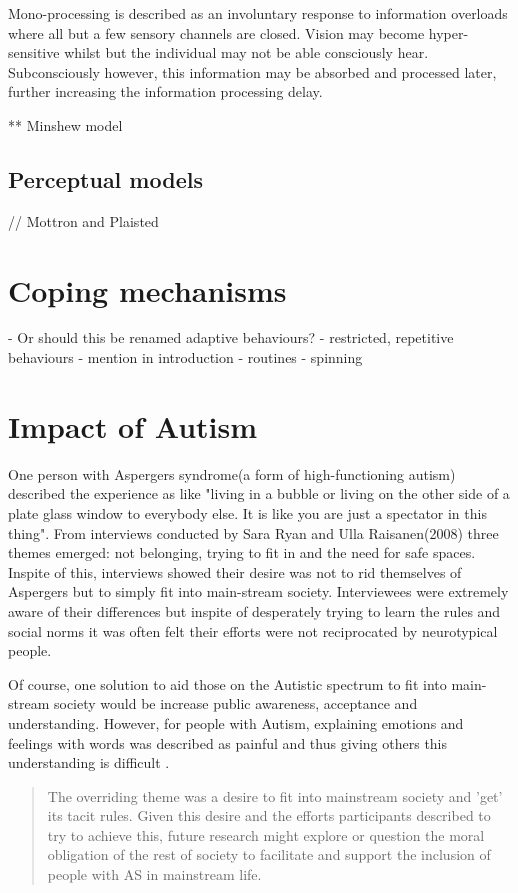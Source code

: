 \documentclass[11pt]{report}
\begin{document}
Mono-processing is described as an involuntary response to information overloads where all but a few sensory channels are closed. Vision may become hyper-sensitive whilst but the individual may not be able consciously hear. Subconsciously however, this information may be absorbed and processed later, further increasing the information processing delay. 

** Minshew model 

\subsection{Perceptual models}
// Mottron and Plaisted


\section{Coping mechanisms}
- Or should this be renamed adaptive behaviours?
- restricted, repetitive behaviours - mention in introduction
- routines
- spinning

\section{Impact of Autism}
One person with Aspergers syndrome(a form of high-functioning autism) described the experience as like "living in a bubble or living on the other side of a plate glass window to everybody else. It is like you are just a spectator in this thing"\cite{aspieway}. From interviews conducted by Sara Ryan and Ulla Raisanen(2008) three themes emerged: not belonging, trying to fit in and the need for safe spaces. Inspite of this, interviews showed their desire was not to rid themselves of Aspergers but to simply fit into main-stream society. Interviewees were extremely aware of their differences but inspite of desperately trying to learn the rules and social norms it was often felt their efforts were not reciprocated by neurotypical people.

Of course, one solution to aid those on the Autistic spectrum to fit into main-stream society would be increase public awareness, acceptance and understanding. However, for people with Autism, explaining emotions and feelings with words was described as painful and thus giving others this understanding is difficult \cite{aspieway}. 

\begin{quote}
The overriding theme was a desire to fit into mainstream society and 'get' its tacit rules. Given this desire and the
efforts participants described to try to achieve this, future research might explore or question the moral obligation of the rest of society to facilitate and support the inclusion of people with AS in mainstream life. \cite{aspieway}
\end{quote}
\end{document}
